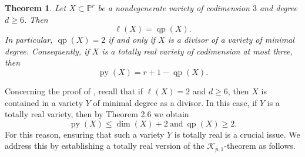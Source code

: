 \documentclass[11pt,letterpaper,reqno]{amsart}
\theoremstyle{plain}
\newtheorem{theorem}{Theorem}[section]
\theoremstyle{definition}
\newtheorem{open problem}[theorem]{Open Problem}
\newtheorem{remark and notation}[theorem]{Remark and Notation}
\newtheorem{remark and definition}[theorem]{Remark and Definition}
\newtheorem{definition and notation}[theorem]{Definition and Notation}
\newtheorem{notation and convention}[theorem]{Notation and Convention}
\newtheorem{notation and remark}[theorem]{Notation and Remark}
\newtheorem{convention and notation}[theorem]{Convention and Notation}
\def \p {\mathbb{P}}
\def \py {\operatorname{py}}
\def \qp {\operatorname{qp}}
\begin{document}
\begin{theorem}\label{mainthm:codim3}
Let $X \subset \p^{r}$ be a nondegenerate variety of codimension $3$ and degree $d \geq 6$.
Then $$\ell(X) = \qp(X).$$ 
In particular, $\qp(X) = 2$ if and only if $X$ is a divisor of a variety of minimal degree.
Consequently, if $X$ is a totally real variety of codimension at most three, then $$\py(X) = r + 1 - \qp(X).$$
\end{theorem}

Concerning the proof of , recall that if $\ell (X) = 2$ and $d \geq 6$, then $X$ is contained in a variety $Y$ of minimal degree as a divisor. In this case, if $Y$ is a totally real variety, then by Theorem 2.6 we obtain  
\begin{equation*}
\py(X) \leq \dim(X)+2 ~ \mbox{and} ~ \qp(X) \geq 2.
\end{equation*}
For this reason, ensuring that such a variety $Y$ is totally real is a crucial issue.
We address this by establishing a totally real version of the $\mathcal{K}_{p,1}$-theorem as follows.
\end{document}
